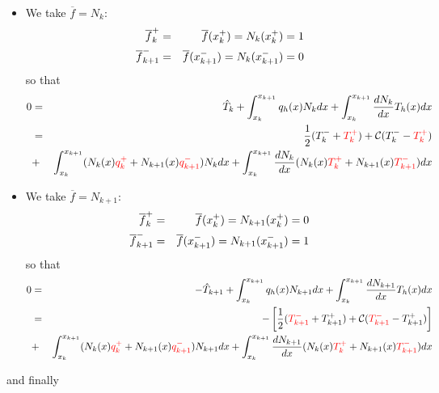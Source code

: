 \begin{itemize}
\begin{itemize}
\item We take $\overline{f}=N_k$: 
\begin{eqnarray}
\overline{f}_k^+&=&\overline{f}(x_k^+)= N_k(x_k^+) =1 \nonumber\\
\overline{f}_{k+1}^-&=&\overline{f}(x_{k+1}^-) = N_k(x_{k+1}^-) = 0\nonumber
\end{eqnarray}
so that 
\begin{eqnarray}
0
&=& \hat{T}_k     
+ \int_{x_k}^{x_{k+1}}  q_h(x) N_k dx
+ \int_{x_k}^{x_{k+1}} \frac{dN_k}{dx} T_h(x) dx  \nonumber\\
&=& 
\frac{1}{2}(T_k^-+{\color{red}T_k^+}) + {\cal C} (T_k^- - {\color{red}T_k^+}) \\
&+& \int_{x_k}^{x_{k+1}}  (N_k(x) {\color{red}q_k^+} + N_{k+1}(x) {\color{red}q_{k+1}^-}) N_k dx
+ \int_{x_k}^{x_{k+1}} \frac{dN_k}{dx} (N_k(x) {\color{red}T_k^+} + N_{k+1}(x) {\color{red}T_{k+1}^-})   dx  \nonumber
\end{eqnarray}

\item We take $\overline{f}=N_{k+1}$:
\begin{eqnarray}
\overline{f}_k^+&=&\overline{f}(x_k^+) = N_{k+1}(x_k^+) = 0 \nonumber\\
\overline{f}_{k+1}^-&=&\overline{f}(x_{k+1}^-) = N_{k+1}(x_{k+1}^-) =1 \nonumber
\end{eqnarray}
so that 
\begin{eqnarray}
0
&=& -\hat{T}_{k+1} 
+ \int_{x_k}^{x_{k+1}}  q_h(x) N_{k+1} dx
+ \int_{x_k}^{x_{k+1}} \frac{dN_{k+1} }{dx} T_h(x) dx  \nonumber\\
&=&-\left[\frac{1}{2}({\color{red}T_{k+1}^-}+T_{k+1}^+) + {\cal C}({\color{red}T_{k+1}^-} -T_{k+1}^+)\right]\\
&+& \int_{x_k}^{x_{k+1}} (N_k(x) {\color{red}q_k^+} + N_{k+1}(x) {\color{red}q_{k+1}^-})  N_{k+1} dx
+ \int_{x_k}^{x_{k+1}} \frac{dN_{k+1} }{dx} (N_k(x) {\color{red} T_k^+} + N_{k+1}(x) {\color{red}T_{k+1}^-}) dx  \nonumber
\end{eqnarray}



 
\end{itemize}

and finally 


\end{itemize}

